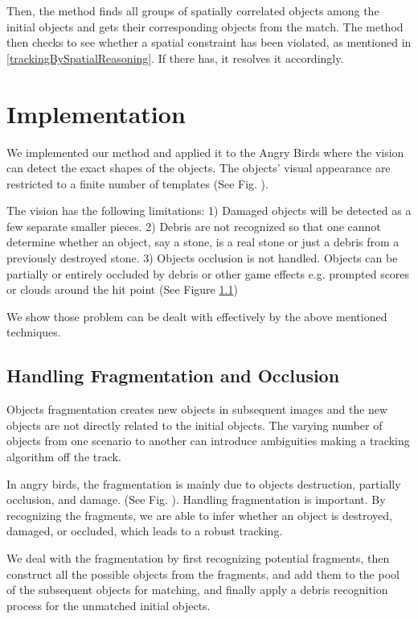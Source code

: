 \documentclass[letterpaper]{article}
\begin{document}
Then, the method finds all groups of spatially correlated objects among the initial objects and gets their corresponding objects from the match. The method then checks to see whether a spatial constraint has been violated, as mentioned in \ref{trackingBySpatialReasoning}. If there has, it resolves it accordingly.


\section{Implementation}
We implemented our method and applied it to the Angry Birds where the vision can detect the exact shapes of the objects\cite{}. The objects' visual appearance are restricted to a finite number of templates (See Fig. ).

The vision has the following limitations: 1) Damaged objects will be detected as a few separate smaller pieces. 2) Debris are not recognized so that one cannot determine whether an object, say a stone, is a real stone or just a debris from a previously destroyed stone. 3) Objects occlusion is not handled. Objects can be partially or entirely occluded by debris or other game effects e.g. prompted scores or clouds around the hit point (See Figure \ref{})

We show those problem can be dealt with effectively by the above mentioned techniques.

\subsection{Handling Fragmentation and Occlusion}

Objects fragmentation creates new objects in subsequent images and the new objects are not directly related to the initial objects. The varying number of objects from one scenario to another can introduce ambiguities making a tracking algorithm off the track. 

In angry birds, the fragmentation is mainly due to objects destruction, partially occlusion, and damage. (See Fig. ). Handling fragmentation is important. By recognizing the fragments, we are able to infer whether an object is destroyed, damaged, or occluded, which leads to a robust tracking.

We deal with the fragmentation by first recognizing potential fragments, then construct all the possible objects from the fragments, and add them to the pool of the subsequent objects for matching, and finally apply a debris recognition process for the unmatched initial objects. 
\end{document}
